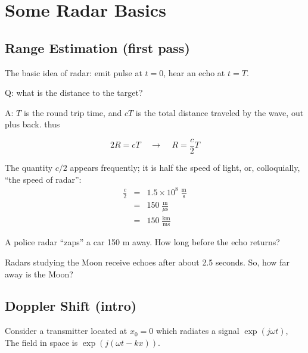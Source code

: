
\chapter{Some Radar Basics}

\section{Range Estimation (first pass)}

The basic idea of radar: emit pulse at $t=0$, hear an echo at $t=T$. 	

Q: what is the distance to the target?

A: $T$ is the round trip time, and $cT$ is the total distance traveled
by the wave, out plus back.  thus

\begin{equation}
2R = cT \;\;\;\; \rightarrow \;\;\;\; R = \frac{c}{2}T
\end{equation}

The quantity $c/2$ appears frequently; it is half the speed of light,
or, colloquially, ``the speed of radar'':
\begin{eqnarray}
\frac{c}{2} &=& 1.5\times 10^8 \; \frac{\textrm{m}}{\textrm{s}} \\
            &=& 150 \; \frac{\textrm{m}}{\mu\textrm{s}} \\
            &=& 150 \; \frac{\textrm{km}}{\textrm{ms}}
\end{eqnarray}

\begin{example}
A police radar ``zaps'' a car 150 m away.  How long before
the echo returns?

\end{example}

\begin{example}
Radars studying the Moon receive echoes after about 2.5 seconds.  So,
how far away is the Moon?


\end{example}

\section{Doppler Shift (intro)}

Consider a transmitter located at $x_0=0$ which radiates a signal
$\exp(j\omega t)$,  The field in space is $\exp(j(\omega t - k x))$.

